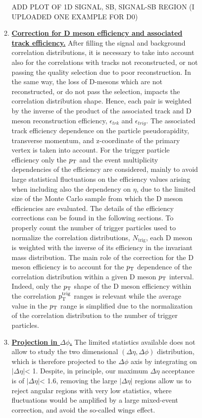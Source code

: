 \begin{enumerate}
\begin{figure}
\begin{enumerate}
\begin{figure}[h]
\end{figure}

ADD PLOT OF 1D SIGNAL, SB, SIGNAL-SB REGION (I UPLOADED ONE EXAMPLE FOR D0)

\item
\underline{\bf Correction for D meson efficiency and associated track efficiency.}
After filling the signal and background correlation distributions, it is necessary to take into account also for the correlations with tracks not reconstructed, or not passing the quality selection due to poor reconstruction. In the same way, the loss of D-mesons which are not reconstructed, or do not pass the selection, impacts the correlation distribution shape. Hence, each pair is weighted by the
inverse of the product of the associated track and D meson reconstruction efficiency, $\epsilon_{trk}$ and $\epsilon_{trig}$.
The associated track efficiency dependence on the particle
pseudorapidity, transverse momentum, and z-coordinate of the primary vertex is taken into account. For the trigger particle
efficiency only the $p_{\rm T}$ and the event multiplicity dependencies of the efficiency are considered, mainly to avoid large statistical fluctuations
on the efficiency values arising when including also the dependency on $\eta$, due to the limited
size of the Monte Carlo sample from which the D meson efficiencies are evaluated. %
The details of the efficiency corrections can be found in the following sections. To properly count
the number of trigger particles used to normalize the correlation distributions, $N_\text{trig}$, each D meson is weighted with the inverse of its efficiency
in the invariant mass distribution. The main role of the correction for the D meson efficiency
is to account for the $p_{\rm T}$ dependence of the correlation distribution within a given
D meson $p_{\rm T}$ interval. Indeed, only the $p_{\rm T}$ shape of the D meson efficiency within the correlation $p_{\rm T}^{\rm trig}$ ranges is relevant while the average value
in the $p_{\rm T}$ range is simplified due to the normalization of the correlation distribution to the number of
trigger particles.

\item
\underline {\bf Projection in $\Delta\phi$.}
The limited statistics available does not allow to study the two dimensional
$(\Delta\eta,\Delta\phi)$ distribution, which is therefore projected to the $\Delta\phi$ axis by integrating on $|\Delta\eta|$< 1. Despite, in principle, our maximum $\Delta\eta$ acceptance is of $|\Delta\eta|$< 1.6, removing the large $|\Delta\eta|$ regions allow us to reject angular regions with very low statistics, where fluctuations would be amplified by a large mixed-event correction, and avoid the so-called wings effect.


\end{enumerate}
\end{figure}
\end{enumerate}
